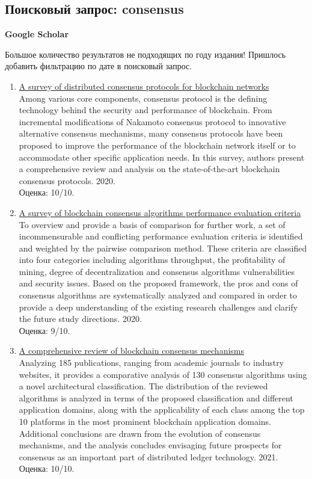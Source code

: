 \documentclass[a4paper, 12pt]{report}		%
\begin{document}
\subsection*{Поисковый запрос: consensus}

\textbf{Google Scholar}

Большое количество результатов не подходящих по году издания! Пришлось добавить фильтрацию по дате в поисковый запрос.

\begin{enumerate}
\item \href{https://ieeexplore.ieee.org/abstract/document/8972381}{A survey of distributed consensus protocols for blockchain networks}\\
Among various core components, consensus protocol is the defining technology behind the security and performance of blockchain. From incremental modifications of Nakamoto consensus protocol to innovative alternative consensus mechanisms, many consensus protocols have been proposed to improve the performance of the blockchain network itself or to accommodate other specific application needs. In this survey, authors present a comprehensive review and analysis on the state-of-the-art blockchain consensus protocols. 2020.\\
Оценка: 10/10.
\item \href{https://www.sciencedirect.com/science/article/abs/pii/S0957417420302098}{A survey of blockchain consensus algorithms performance evaluation criteria}\\
To overview and provide a basis of comparison for further work, a set of incommensurable and conflicting performance evaluation criteria is identified and weighted by the pairwise comparison method. These criteria are classified into four categories including algorithms throughput, the profitability of mining, degree of decentralization and consensus algorithms vulnerabilities and security issues. Based on the proposed framework, the pros and cons of consensus algorithms are systematically analyzed and compared in order to provide a deep understanding of the existing research challenges and clarify the future study directions. 2020.\\
Оценка: 9/10.
\item \href{https://ieeexplore.ieee.org/abstract/document/9376868}{A comprehensive review of blockchain consensus mechanisms}\\
Analyzing 185 publications, ranging from academic journals to industry websites, it provides a comparative analysis of 130 consensus algorithms using a novel architectural classification. The distribution of the reviewed algorithms is analyzed in terms of the proposed classification and different application domains, along with the applicability of each class among the top 10 platforms in the most prominent blockchain application domains. Additional conclusions are drawn from the evolution of consensus mechanisms, and the analysis concludes envisaging future prospects for consensus as an important part of distributed ledger technology. 2021.\\
Оценка: 10/10.
\end{enumerate}
\end{document}
